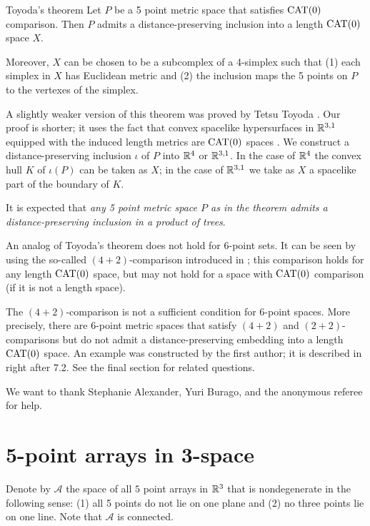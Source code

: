 \documentclass{article}
\begin{document}
\begin{thm}{Toyoda's theorem}
Let $P$ be a 5 point metric space that satisfies $\mathrm{CAT}(0)$ comparison.
Then $P$ admits a distance-preserving inclusion into a length $\mathrm{CAT}(0)$ space $X$.

Moreover,
$X$ can be chosen to be a subcomplex of a 4-simplex such that (1) each simplex in $X$ has Euclidean metric and (2) the inclusion maps the 5 points on $P$ to the vertexes of the simplex.
\end{thm}

A slightly weaker version of this theorem was proved by Tetsu Toyoda \cite{toyoda}.
Our proof is shorter; it uses the fact that convex spacelike hypersurfaces in $\mathbb{R}^{3,1}$ equipped with the induced length metrics are $\mathrm{CAT}(0)$ spaces \cite{milka}.
We construct a distance-preserving inclusion $\iota$ of $P$ into $\mathbb{R}^4$ or $\mathbb{R}^{3,1}$.
In the case of $\mathbb{R}^4$ the convex hull $K$ of $\iota(P)$ can be taken as $X$;
in the case of $\mathbb{R}^{3,1}$ we take as $X$ a spacelike part of the boundary of $K$.

It is expected that \emph{any 5 point metric space $P$ as in the theorem admits a distance-preserving inclusion in a product of trees}.

An analog of Toyoda's theorem does not hold for 6-point sets.
It can be seen by using the so-called $(4{+}2)$-comparison introduced in \cite{alexander-kapovitch-petrunin-2011};
this comparison holds for any length $\mathrm{CAT}(0)$ space, but may not hold for a space with $\mathrm{CAT}(0)$ comparison (if it is not a length space).

{\sloppy

The $(4{+}2)$-comparison is not a sufficient condition for $6$-point spaces.
More precisely, there are 6-point metric spaces that satisfy $(4{+}2)$ and $(2{+}2)$-comparisons but do not admit a distance-preserving embedding into a length $\mathrm{CAT}(0)$ space.
An example was constructed by the first author; it is described in \cite{alexander-kapovitch-petrunin-2011} right after 7.2.
See the final section for related questions.

}

We want to thank Stephanie Alexander,
Yuri Burago,
and the anonymous referee for help.

\section{5-point arrays in 3-space}

Denote by $\mathcal{A}$ the space of all $5$ point arrays in $\mathbb{R}^3$ that is nondegenerate in the following sense: (1) all 5 points do not lie on one plane and (2) no three points lie on one line.
Note that $\mathcal{A}$ is connected.
\end{document}
